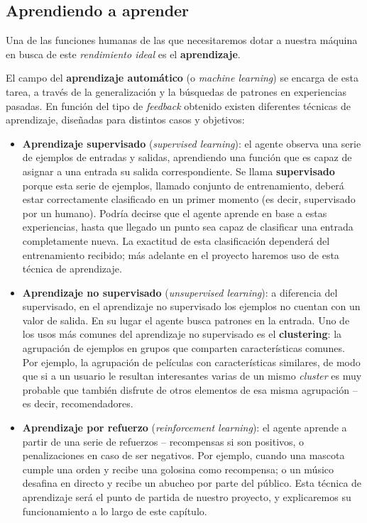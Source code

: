 \subsection{Aprendiendo a aprender}
Una de las funciones humanas de las que necesitaremos dotar a nuestra máquina en busca de este \textit{rendimiento ideal} es el \textbf{aprendizaje}.

El campo del \textbf{aprendizaje automático} (o \textit{machine learning}) se encarga de esta tarea, a través de la generalización y la búsquedas de patrones en experiencias pasadas. En función del tipo de \textit{feedback} obtenido existen diferentes técnicas de aprendizaje, diseñadas para distintos casos y objetivos:
\begin{itemize}
    \item \textbf{Aprendizaje supervisado} (\textit{supervised learning}): el agente observa una serie de ejemplos de entradas y salidas, aprendiendo una función que es capaz de asignar a una entrada su salida correspondiente. Se llama \textbf{supervisado} porque esta serie de ejemplos, llamado conjunto de entrenamiento, deberá estar correctamente clasificado en un primer momento (es decir, supervisado por un humano). Podría decirse que el agente aprende en base a estas experiencias, hasta que llegado un punto sea capaz de clasificar una entrada completamente nueva. La exactitud de esta clasificación dependerá del entrenamiento recibido; más adelante en el proyecto haremos uso de esta técnica de aprendizaje.
    \item \textbf{Aprendizaje no supervisado} (\textit{unsupervised learning}): a diferencia del supervisado, en el aprendizaje no supervisado los ejemplos no cuentan con un valor de salida. En su lugar el agente busca patrones en la entrada. Uno de los usos más comunes del aprendizaje no supervisado es el \textbf{clustering}: la agrupación de ejemplos en grupos que comparten características comunes. Por ejemplo, la agrupación de películas con características similares, de modo que si a un usuario le resultan interesantes varias de un mismo \textit{cluster} es muy probable que también disfrute de otros elementos de esa misma agrupación – es decir, recomendadores.
    \item \textbf{Aprendizaje por refuerzo} (\textit{reinforcement learning}): el agente aprende a partir de una serie de refuerzos – recompensas si son positivos, o penalizaciones en caso de ser negativos. Por ejemplo, cuando una mascota cumple una orden y recibe una golosina como recompensa; o un músico desafina en directo y recibe un abucheo por parte del público. Esta técnica de aprendizaje será el punto de partida de nuestro proyecto, y explicaremos su funcionamiento a lo largo de este capítulo.
\end{itemize}

